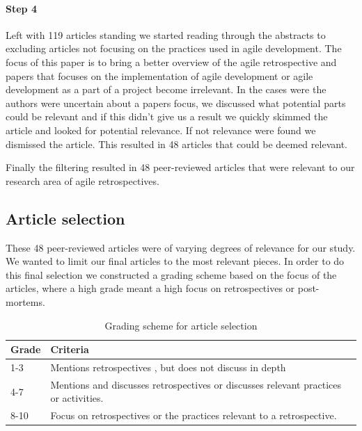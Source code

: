 \documentclass[12pt]{article}
\begin{document}
\paragraph{Step 4}
Left with 119 articles standing we started reading through the abstracts to excluding articles not focusing on the practices used in agile development. The focus of this paper is to bring a better overview of the agile retrospective and papers that focuses on the implementation of agile development or agile development as a part of a project become irrelevant. In the cases were the authors were uncertain about a papers focus, we discussed what potential parts could be relevant and if this didn't give us a result we quickly skimmed the article and looked for potential relevance. If not relevance were found we dismissed the article. This resulted in 48 articles that could be deemed relevant. 

Finally the filtering resulted in 48 peer-reviewed articles that were relevant to our research area of agile retrospectives. 

\subsection{Article selection}
These 48 peer-reviewed articles were of varying degrees of relevance for our study. We wanted to limit our final articles to the most relevant pieces. In order to do this final selection we constructed a grading scheme based on the focus of the articles, where a high grade meant a high focus on retrospectives or post-mortems. 

\begin{table}[!h]
	\centering
	\caption{Grading scheme for article selection}
	\label{table:article_grading}
	\begin{tabular}{l | p{}}
		\hline
		Grade & Criteria \\
		\hline
		1-3 & Mentions retrospectives , but does not discuss in depth \\
		4-7 & Mentions and discusses retrospectives  or discusses relevant practices or activities. \\
		8-10 & Focus on retrospectives or the practices relevant to a retrospective. \\
	\end{tabular}
\end{table}		
\end{document}
